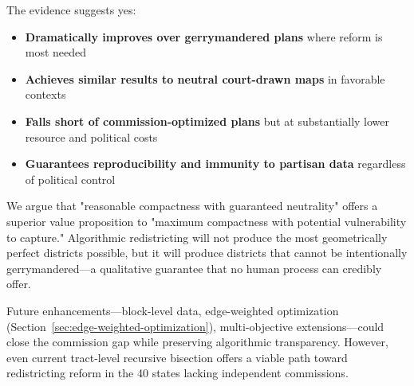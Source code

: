 The evidence suggests yes:

\begin{itemize}
\item \textbf{Dramatically improves over gerrymandered plans} where reform is most needed
\item \textbf{Achieves similar results to neutral court-drawn maps} in favorable contexts
\item \textbf{Falls short of commission-optimized plans} but at substantially lower resource and political costs
\item \textbf{Guarantees reproducibility and immunity to partisan data} regardless of political control
\end{itemize}

We argue that "reasonable compactness with guaranteed neutrality" offers a superior value proposition to "maximum compactness with potential vulnerability to capture." Algorithmic redistricting will not produce the most geometrically perfect districts possible, but it will produce districts that cannot be intentionally gerrymandered—a qualitative guarantee that no human process can credibly offer.

Future enhancements—block-level data, edge-weighted optimization (Section~\ref{sec:edge-weighted-optimization}), multi-objective extensions—could close the commission gap while preserving algorithmic transparency. However, even current tract-level recursive bisection offers a viable path toward redistricting reform in the 40 states lacking independent commissions.

